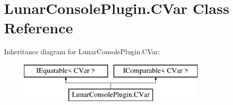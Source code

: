\hypertarget{class_lunar_console_plugin_1_1_c_var}{}\section{Lunar\+Console\+Plugin.\+C\+Var Class Reference}
\label{class_lunar_console_plugin_1_1_c_var}
Inheritance diagram for Lunar\+Console\+Plugin.\+C\+Var\+:\begin{figure}[H]
\begin{center}
\leavevmode
\includegraphics[height=2.000000cm]{class_lunar_console_plugin_1_1_c_var}
\end{center}
\end{figure}
